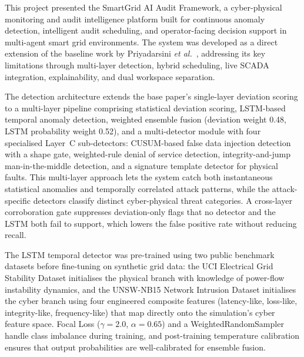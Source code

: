 

This project presented the SmartGrid AI Audit Framework, a cyber-physical monitoring and audit intelligence platform built for continuous anomaly detection, intelligent audit scheduling, and operator-facing decision support in multi-agent smart grid environments. The system was developed as a direct extension of the baseline work by Priyadarsini \textit{et al.}~\cite{priyadarsini2025}, addressing its key limitations through multi-layer detection, hybrid scheduling, live SCADA integration, explainability, and dual workspace separation.

\par \vspace{0.35cm}

\noindent
The detection architecture extends the base paper's single-layer deviation scoring to a multi-layer pipeline comprising statistical deviation scoring, LSTM-based temporal anomaly detection, weighted ensemble fusion (deviation weight 0.48, LSTM probability weight 0.52), and a multi-detector module with four specialised Layer~C sub-detectors: CUSUM-based false data injection detection with a shape gate, weighted-rule denial of service detection, integrity-and-jump man-in-the-middle detection, and a signature template detector for physical faults. This multi-layer approach lets the system catch both instantaneous statistical anomalies and temporally correlated attack patterns, while the attack-specific detectors classify distinct cyber-physical threat categories. A cross-layer corroboration gate suppresses deviation-only flags that no detector and the LSTM both fail to support, which lowers the false positive rate without reducing recall.

\par \vspace{0.35cm}

\noindent
The LSTM temporal detector was pre-trained using two public benchmark datasets before fine-tuning on synthetic grid data: the UCI Electrical Grid Stability Dataset initialises the physical branch with knowledge of power-flow instability dynamics, and the UNSW-NB15 Network Intrusion Dataset initialises the cyber branch using four engineered composite features (latency-like, loss-like, integrity-like, frequency-like) that map directly onto the simulation's cyber feature space. Focal Loss ($\gamma=2.0$, $\alpha=0.65$) and a WeightedRandomSampler handle class imbalance during training, and post-training temperature calibration ensures that output probabilities are well-calibrated for ensemble fusion.

